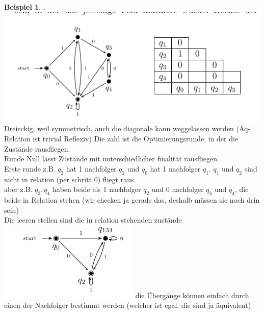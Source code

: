 \documentclass{article}
\theoremstyle{definition}
\newtheorem{beispiel}{Beispiel}[section]
\begin{document}
	\begin{beispiel}.\\
	\includegraphics{images/MinimierungBsp.png}\\
	Dreieckig, weil symmetrisch, auch die diagonale kann weggelassen werden (Äq-Relation ist trivial Reflexiv)
	Die zahl ist die Optimierungsrunde, in der die Zustände rausfliegen.\\
	Runde Null lässt Zustände mit unterschiedlicher finalität rausfliegen.\\
	Erste runde z.B. $q_2$ hat 1 nachfolger $q_2$ und $q_0$ hat 1 nachfolger $q_1$. $q_1$  und $q_2$ sind nicht in relation (per schritt 0) fliegt raus.\\
	aber z.B. $q_3,q_4$ haben beide als 1 nachfolger $q_2$ und 0 nachfolger $q_3$ und $q_4$, die beide in Relation stehen (wir checken ja gerade das, deshalb müssen sie noch drin sein) \\
	Die leeren stellen sind die in relation stehenden zustände\\
	\includegraphics{images/MinimalerAutomat.png}
	die Übergänge können einfach durch einen der Nachfolger bestimmt werden (welcher ist egal, die sind ja äquivalent)
	\end{beispiel}
\end{document}
